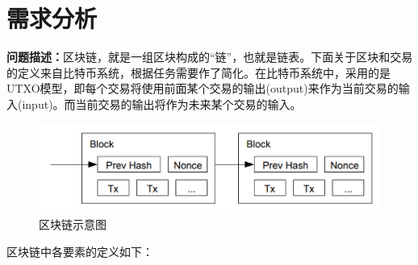 \documentclass[10pt,a4paper]{article}
\begin{document}
	\section{需求分析}
    \noindent \textbf{问题描述：}区块链，就是一组区块构成的“链”，也就是链表。下面关于区块和交易的定义来自比特币系统，根据任务需要作了简化。在比特币系统中，采用的是UTXO模型，即每个交易将使用前面某个交易的输出(output)来作为当前交易的输入(input)。而当前交易的输出将作为未来某个交易的输入。
    \begin{figure}[htbp]
		\centering
		\includegraphics[width=0.7\linewidth]{BlockChainTransactions.png}
		\caption{区块链示意图}	
	\end{figure}
    区块链中各要素的定义如下：
\end{document}
